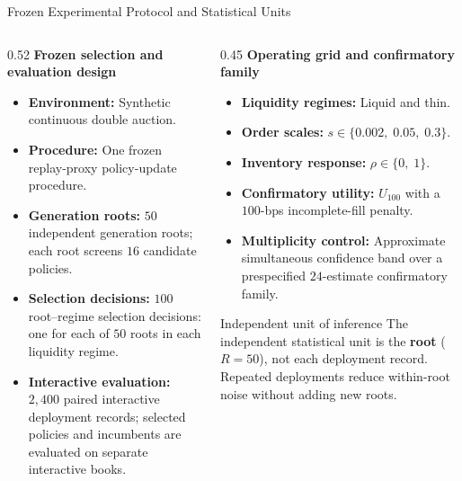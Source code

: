 \documentclass[10pt,aspectratio=169]{beamer}
\begin{document}
\begin{frame}{Frozen Experimental Protocol and Statistical Units}
  \footnotesize
  \begin{columns}[T,onlytextwidth]
    \begin{column}{0.52\textwidth}
      \textbf{Frozen selection and evaluation design}
      \begin{itemize}\itemsep0.25em\parskip0pt
        \item \textbf{Environment:} Synthetic continuous double auction.
        \item \textbf{Procedure:} One frozen replay-proxy policy-update procedure.
        \item \textbf{Generation roots:} $50$ independent generation roots; each root screens $16$ candidate policies.
        \item \textbf{Selection decisions:} $100$ root--regime selection decisions: one for each of $50$ roots in each liquidity regime.
        \item \textbf{Interactive evaluation:} $2{,}400$ paired interactive deployment records; selected policies and incumbents are evaluated on separate interactive books.
      \end{itemize}
    \end{column}
    \begin{column}{0.45\textwidth}
      \textbf{Operating grid and confirmatory family}
      \begin{itemize}\itemsep0.25em\parskip0pt
        \item \textbf{Liquidity regimes:} Liquid and thin.
        \item \textbf{Order scales:} $s \in \{0.002,\; 0.05,\; 0.3\}$.
        \item \textbf{Inventory response:} $\rho \in \{0,\; 1\}$.
        \item \textbf{Confirmatory utility:} $U_{100}$ with a $100$-bps incomplete-fill penalty.
        \item \textbf{Multiplicity control:} Approximate simultaneous confidence band over a prespecified $24$-estimate confirmatory family.
      \end{itemize}
      \vspace{0.2em}
      \begin{block}{Independent unit of inference}
        The independent statistical unit is the \textbf{root} ($R=50$), not each deployment record. Repeated deployments reduce within-root noise without adding new roots.
      \end{block}
    \end{column}
  \end{columns}
\end{frame}
\end{document}
